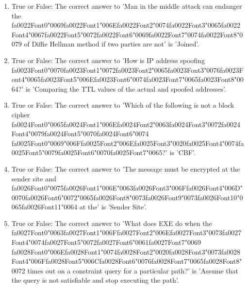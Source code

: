 \documentclass[12pt]{article}
\begin{document}
\begin{enumerate}[label=\arabic*.]
\item True or False: The correct answer to 'Man in the middle attack can endanger the {\csname fa0022Font0\endcsname\char"0069}{\csname fa0022Font1\endcsname\char"006E}{\csname fa0022Font2\endcsname\char"0074}{\csname fa0022Font3\endcsname\char"0065}{\csname fa0022Font4\endcsname\char"0067}{\csname fa0022Font5\endcsname\char"0072}{\csname fa0022Font6\endcsname\char"0069}{\csname fa0022Font7\endcsname\char"0074}{\csname fa0022Font8\endcsname\char"0079} of Diffie Hellman method if two parties are not' is 'Joined'.
\item True or False: The correct answer to 'How is IP address spoofing {\csname fa0023Font0\endcsname\char"0070}{\csname fa0023Font1\endcsname\char"0072}{\csname fa0023Font2\endcsname\char"0065}{\csname fa0023Font3\endcsname\char"0076}{\csname fa0023Font4\endcsname\char"0065}{\csname fa0023Font5\endcsname\char"006E}{\csname fa0023Font6\endcsname\char"0074}{\csname fa0023Font7\endcsname\char"0065}{\csname fa0023Font8\endcsname\char"0064}?' is 'Comparing the TTL values of the actual and spoofed addresses'.
\item True or False: The correct answer to 'Which of the following is not a block cipher {\csname fa0024Font0\endcsname\char"0065}{\csname fa0024Font1\endcsname\char"006E}{\csname fa0024Font2\endcsname\char"0063}{\csname fa0024Font3\endcsname\char"0072}{\csname fa0024Font4\endcsname\char"0079}{\csname fa0024Font5\endcsname\char"0070}{\csname fa0024Font6\endcsname\char"0074} {\csname fa0025Font0\endcsname\char"0069}{\char"006F}{\csname fa0025Font2\endcsname\char"006E}{\csname fa0025Font3\endcsname\char"0020}{\csname fa0025Font4\endcsname\char"0074}{\csname fa0025Font5\endcsname\char"0079}{\csname fa0025Font6\endcsname\char"0070}{\csname fa0025Font7\endcsname\char"0065}?' is 'CBF'.
\item True or False: The correct answer to 'The message must be encrypted at the sender site and {\csname fa0026Font0\endcsname\char"0075}{\csname fa0026Font1\endcsname\char"006E}{\char"0063}{\csname fa0026Font3\endcsname\char"006F}{\csname fa0026Font4\endcsname\char"006D}{\char"0070}{\csname fa0026Font6\endcsname\char"0072}{\char"0065}{\csname fa0026Font8\endcsname\char"0073}{\csname fa0026Font9\endcsname\char"0073}{\csname fa0026Font10\endcsname\char"0065}{\csname fa0026Font11\endcsname\char"0064} at the' is 'Sender Site'.
\item True or False: The correct answer to 'What does EXE do when the {\csname fa0027Font0\endcsname\char"0063}{\csname fa0027Font1\endcsname\char"006F}{\csname fa0027Font2\endcsname\char"006E}{\csname fa0027Font3\endcsname\char"0073}{\csname fa0027Font4\endcsname\char"0074}{\csname fa0027Font5\endcsname\char"0072}{\csname fa0027Font6\endcsname\char"0061}{\csname fa0027Font7\endcsname\char"0069} {\csname fa0028Font0\endcsname\char"006E}{\csname fa0028Font1\endcsname\char"0074}{\csname fa0028Font2\endcsname\char"0020}{\csname fa0028Font3\endcsname\char"0073}{\csname fa0028Font4\endcsname\char"006F}{\csname fa0028Font5\endcsname\char"006C}{\csname fa0028Font6\endcsname\char"0076}{\csname fa0028Font7\endcsname\char"0065}{\csname fa0028Font8\endcsname\char"0072} times out on a constraint query for a particular path?' is 'Assume that the query is not satisfiable and stop executing the path'.

\end{enumerate}
\end{document}
